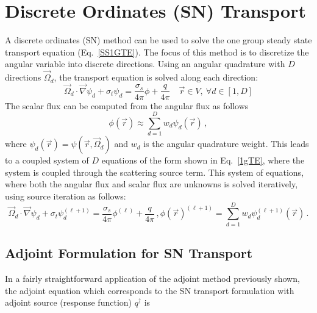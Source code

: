 \documentclass[12pt]{report}
\newcommand{\vr}{\vec{r}}
\newcommand{\vO}{\vec{\Omega}}
\newcommand{\grad}{\vec{\nabla}}
\newcommand{\sigt}{\sigma_t}
\newcommand{\sigs}{\sigma_s}
\newcommand{\angSource}{\frac{q}{4 \pi}}
\newcommand{\angResp}{q^\dag}
\begin{document}
\section{Discrete Ordinates (SN) Transport}
A discrete ordinates (SN) method can be used to solve the one group steady state transport 
equation (Eq.~\eqref{SS1GTE}). The focus of this method is to discretize the angular variable 
into discrete directions. Using an angular quadrature with $D$ directions $\vO_d$, the transport 
equation is solved along each direction:
\begin{equation}
\label{1gTE}
\vO_d \cdot \grad \psi_d + \sigt \psi_d = \frac{\sigs}{4 \pi} \phi + \angSource \quad \vr \in V ,\  \forall d\in [1,D]
\end{equation}
%
The scalar flux can be computed from the angular flux as follows
\[
\phi(\vr) \approx \sum_{d=1}^D w_d \psi_d(\vr) \,,
\] 
where $\psi_d(\vr) = \psi(\vr, \vO_d)$ and $w_d$ is the angular quadrature weight. This leads to a coupled system of $D$ equations of the form shown in Eq.~\eqref{1gTE}, where the system is coupled through the scattering source term. This system of equations, where both 
the angular flux and scalar flux are unknowns is solved iteratively, using source iteration as follows:
\begin{subequations}
\begin{equation}
\label{1gTE}
\vO_d \cdot \grad \psi_d + \sigt \psi_d^{(\ell+1)} = \frac{\sigs}{4 \pi} \phi^{(\ell)} + \angSource \,,
\end{equation}
\begin{equation}
\phi(\vr)^{(\ell+1)} = \sum_{d=1}^D w_d \psi_d^{(\ell+1)}(\vr) \,.
\end{equation}
\end{subequations}




\subsection{Adjoint Formulation for SN Transport}
In a fairly straightforward application of the adjoint method previously shown, the adjoint equation which corresponds to the SN transport formulation with adjoint source (response function)
$\angResp$ is
\end{document}
